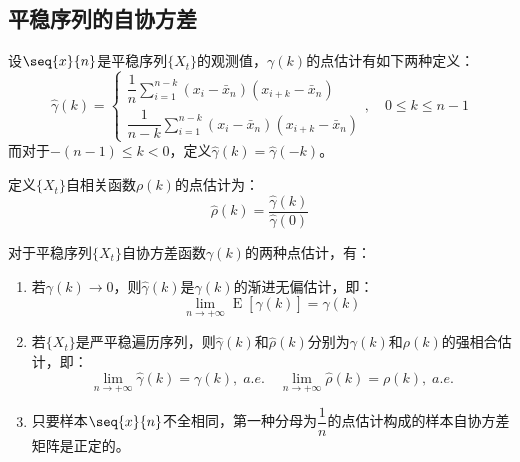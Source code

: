 \subsection{平稳序列的自协方差}
\begin{definition}
	设$\seq{x}{n}$是平稳序列$\{X_t\}$的观测值，$\gamma(k)$的点估计有如下两种定义：
	\begin{equation*}
		\hat{\gamma}(k)=
		\begin{cases}
			\dfrac{1}{n}\sum\limits_{i=1}^{n-k}(x_i-\bar{x}_n)(x_{i+k}-\bar{x}_n) \\
			\dfrac{1}{n-k}\sum\limits_{i=1}^{n-k}(x_i-\bar{x}_n)(x_{i+k}-\bar{x}_n)
		\end{cases},\quad 0\leqslant k\leqslant n-1
	\end{equation*}
	而对于$-(n-1)\leqslant k<0$，定义$\hat{\gamma}(k)=\hat{\gamma}(-k)$。\par
	定义$\{X_t\}$自相关函数$\rho(k)$的点估计为：
	\begin{equation*}
		\hat{\rho}(k)=\frac{\hat{\gamma}(k)}{\hat{\gamma}(0)}
	\end{equation*}
\end{definition}
\begin{theorem}\label{theo:StationarySeriesAutoCovariancePE}
	对于平稳序列$\{X_t\}$自协方差函数$\gamma(k)$的两种点估计，有：
	\begin{enumerate}
		\item 若$\gamma(k)\to0$，则$\hat{\gamma}(k)$是$\gamma(k)$的渐进无偏估计，即：
		\begin{equation*}
			\lim_{n\to+\infty}\operatorname{E}[\hat{\gamma}(k)]=\gamma(k)
		\end{equation*}
		\item 若$\{X_t\}$是严平稳遍历序列，则$\hat{\gamma}(k)$和$\hat{\rho}(k)$分别为$\gamma(k)$和$\rho(k)$的强相合估计，即：
		\begin{equation*}
			\lim_{n\to+\infty}\hat{\gamma}(k)=\gamma(k),\;a.e.\quad
			\lim_{n\to+\infty}\hat{\rho}(k)=\rho(k),\;a.e.
		\end{equation*}
		\item 只要样本$\seq{x}{n}$不全相同，第一种分母为$\dfrac{1}{n}$的点估计构成的样本自协方差矩阵是正定的。
	\end{enumerate}
\end{theorem}
